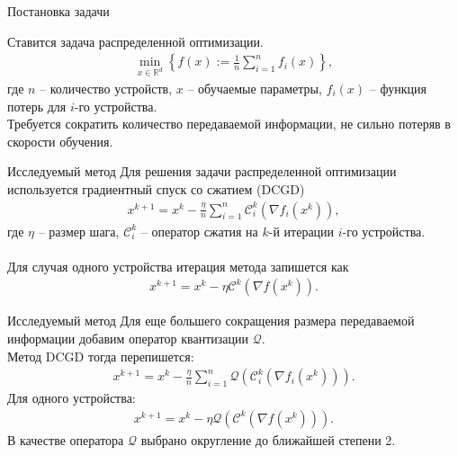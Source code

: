 \documentclass{beamer}
\begin{document}
\begin{frame}{Постановка задачи}

    Ставится задача распределенной оптимизации.
    \begin{align*}
     \min_{x \in \mathbb{R}^d}\left\{f(x) := \frac{1}{n}\sum\limits_{i = 1}^n f_i(x) \right\},
    \end{align*}
    где $n$ -- количество устройств, $x$ -- обучаемые параметры, $f_i(x)$ -- функция потерь для $i$-го устройства.\\
    Требуется сократить количество передаваемой информации, не сильно потеряв в скорости обучения.

\end{frame}




\begin{frame}{Исследуемый метод}
    Для решения задачи распределенной оптимизации используется градиентный спуск со сжатием (DCGD)
    \begin{align*}
     x^{k + 1} = x^k - \frac{\eta}{n} \sum\limits_{i = 1}^n\mathcal{C}_i^k(\nabla f_i(x^k)),
    \end{align*}
    где $\eta$ -- размер шага, $\mathcal{C}_i^k$ -- оператор сжатия на $k$-й итерации $i$-го устройства.\\

    $ $\\
    Для случая одного устройства итерация метода запишется как
    \begin{align*}
     x^{k + 1} = x^k - \eta\mathcal{C}^k(\nabla f(x^k)).
    \end{align*}
\end{frame}

\begin{frame}{Исследуемый метод}
    Для еще большего сокращения размера передаваемой информации добавим оператор квантизации $\mathcal{Q}$.\\
    Метод DCGD тогда перепишется:
    \begin{align*}
     x^{k + 1} = x^k - \frac{\eta}{n} \sum\limits_{i = 1}^n \mathcal{Q}\left(\mathcal{C}_i^k(\nabla f_i(x^k))\right).
    \end{align*}
    Для одного устройства:
    \begin{align*}
     x^{k + 1} = x^k - \eta\mathcal{Q}\left(\mathcal{C}^k(\nabla f(x^k))\right).
    \end{align*}
    В качестве оператора $\mathcal{Q}$ выбрано округление до ближайшей степени 2.
\end{frame}
\end{document}
